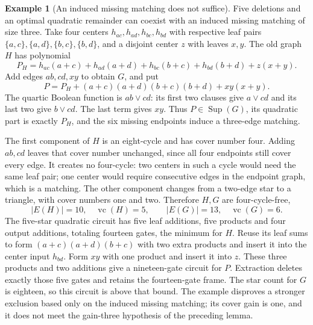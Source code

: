 \documentclass[11pt]{article}
\newcommand{\Sup}{\operatorname{Sup}}
\newcommand{\vc}{\operatorname{vc}}
\theoremstyle{definition}
\newtheorem{example}[theorem]{Example}
\theoremstyle{remark}
\begin{document}
\begin{example}[An induced missing matching does not suffice]\label{ex:missingmatching}
Five deletions and an optimal quadratic remainder can coexist with an induced missing matching of size three. Take four centers $h_{ac},h_{ad},h_{bc},h_{bd}$ with respective leaf pairs $\{a,c\},\{a,d\},\{b,c\},\{b,d\}$, and a disjoint center $z$ with leaves $x,y$. The old graph $H$ has polynomial
\[
 P_H=h_{ac}(a+c)+h_{ad}(a+d)+h_{bc}(b+c)+h_{bd}(b+d)+z(x+y).
\]
Add edges $ab,cd,xy$ to obtain $G$, and put
\[
 P=P_H+(a+c)(a+d)(b+c)(b+d)+xy(x+y).
\]
The quartic Boolean function is $ab\vee cd$: its first two clauses give $a\vee cd$ and its last two give $b\vee cd$. The last term gives $xy$. Thus $P\in\Sup(G)$, its quadratic part is exactly $P_H$, and the six missing endpoints induce a three-edge matching.

The first component of $H$ is an eight-cycle and has cover number four. Adding $ab,cd$ leaves that cover number unchanged, since all four endpoints still cover every edge. It creates no four-cycle: two centers in such a cycle would need the same leaf pair; one center would require consecutive edges in the endpoint graph, which is a matching. The other component changes from a two-edge star to a triangle, with cover numbers one and two. Therefore $H,G$ are four-cycle-free,
\[
 |E(H)|=10,\quad\vc(H)=5,\qquad |E(G)|=13,\quad\vc(G)=6.
\]
The five-star quadratic circuit has five leaf additions, five products and four output additions, totaling fourteen gates, the minimum for $H$. Reuse its leaf sums to form $(a+c)(a+d)(b+c)$ with two extra products and insert it into the center input $h_{bd}$. Form $xy$ with one product and insert it into $z$. These three products and two additions give a nineteen-gate circuit for $P$. Extraction deletes exactly those five gates and retains the fourteen-gate frame. The star count for $G$ is eighteen, so this circuit is above that bound. The example disproves a stronger exclusion based only on the induced missing matching; its cover gain is one, and it does not meet the gain-three hypothesis of the preceding lemma.
\end{example}
\end{document}
